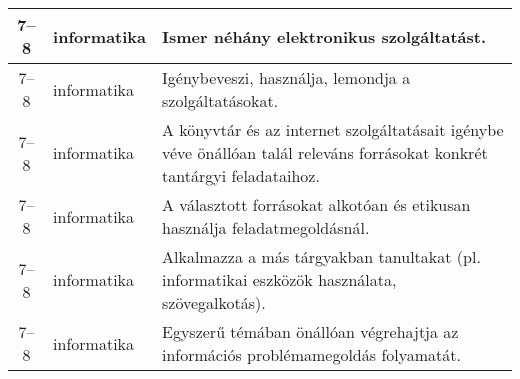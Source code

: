 \begin{small}
\begin{longtable}{c | p{2cm} |  p{11cm} }
              7--8 & informatika & Ismer néhány elektronikus szolgáltatást. \\ \hline
              7--8 & informatika & Igénybeveszi, használja, lemondja a szolgáltatásokat. \\ \hline
              7--8 & informatika & A könyvtár és az internet szolgáltatásait igénybe véve önállóan talál releváns forrásokat konkrét tantárgyi feladataihoz. \\ \hline
              7--8 & informatika & A választott forrásokat alkotóan és etikusan használja feladatmegoldásnál. \\ \hline
              7--8 & informatika & Alkalmazza a más tárgyakban tanultakat (pl. informatikai eszközök használata, szövegalkotás). \\ \hline
              7--8 & informatika & Egyszerű témában önállóan végrehajtja az információs problémamegoldás folyamatát. \\ \hline
      \end{longtable}
\end{small}


